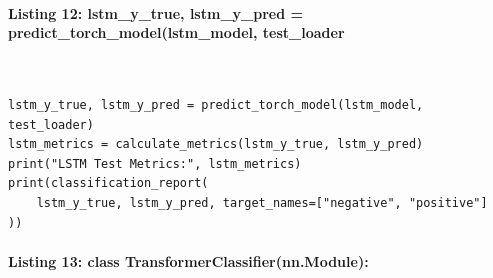 \documentclass[12pt,a4paper,oneside]{report}
\begin{document}
\paragraph{Listing 12: lstm\_y\_true, lstm\_y\_pred = predict\_torch\_model(lstm\_model, test\_loader}\mbox{}\\[-1ex]
\begin{Verbatim}[commandchars=\\\{\},breaklines=true,breakanywhere=true,fontsize=\scriptsize,frame=leftline,framesep=2mm,rulecolor=\color{gray}]
lstm_y_true, lstm_y_pred = predict_torch_model(lstm_model, test_loader)
lstm_metrics = calculate_metrics(lstm_y_true, lstm_y_pred)
print("LSTM Test Metrics:", lstm_metrics)
print(classification_report(
    lstm_y_true, lstm_y_pred, target_names=["negative", "positive"]
))
\end{Verbatim}
\paragraph{Listing 13: class TransformerClassifier(nn.Module):}\mbox{}\\[-1ex]
\end{document}
